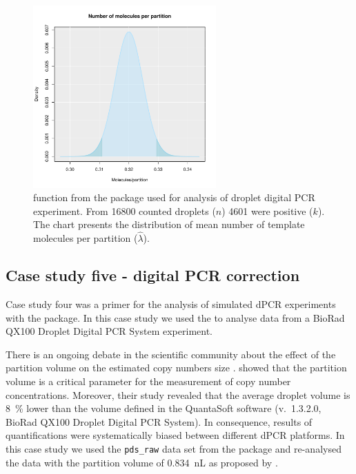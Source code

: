 \begin{figure}[htbp]
  \centering
  \includegraphics[clip=true, width=7cm]{figures/dpcR.pdf}
  \caption{ function from the  package used 
for analysis of droplet digital PCR experiment. From 16800 counted droplets 
($n$) 4601 were positive ($k$). The chart presents the distribution of mean 
number of 
template molecules per partition ($\hat \lambda$). 
}
  \label{figure:dpcR}
\end{figure}

\subsection{Case study five - digital PCR correction}

Case study four was a primer for the analysis of simulated dPCR experiments with 
the  package. In this case study we used the  to 
analyse data from a BioRad QX100 Droplet Digital PCR System experiment.

There is an ongoing debate in the scientific community about the effect of the 
partition volume on the estimated copy numbers size 
\citep{huggett_clinchem_2014, corbisier_2015,majumdar_2015}. 
\citet{corbisier_2015} showed that the partition volume is a critical parameter 
for the measurement of copy number concentrations. Moreover, their study 
revealed that the average droplet volume is 8~\% lower than the volume defined 
in the QuantaSoft software (v.~1.3.2.0, BioRad QX100 Droplet Digital PCR 
System). In consequence, results of quantifications were systematically biased 
between different dPCR platforms. In this case study we used the 
\texttt{pds\_raw} data set from the  package and re-analysed the 
data with the partition volume of 0.834~nL as proposed by 
\citet{corbisier_2015}.


